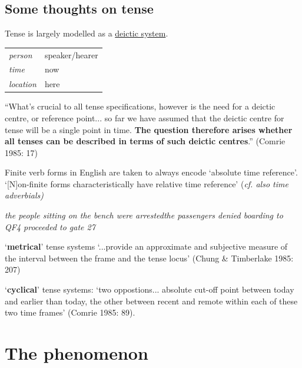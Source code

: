 \documentclass[11pt]{article}
\begin{document}
\begin{framed}
\vspace{-.4cm}\section*{Some thoughts on tense}
Tense is largely modelled as a \underline{deictic system}.\\\begin{tabular}{ll}
\textit{person} & {\sc speaker/hearer}\\
\textit{time} & {\sc now}\\
\textit{location} & {\sc here}
\end{tabular}


\vspace{.5cm}
``What's crucial to all tense specifications, however is the need for a deictic centre, or reference point... so far we have assumed that the deictic centre for tense will be a single point in time.  \textbf{The question therefore arises whether all tenses can be described in terms of such deictic centres}.'' (Comrie 1985: 17)

\vspace{.5cm}
Finite verb forms in English are taken to always encode `absolute time reference'. `[N]on-finite forms characteristically have relative time reference' (\textit{cf. also time adverbials)}
\begin{exe}\ex
\textit{the people sitting on the bench were arrested}\ex \textit{the passengers denied boarding to QF4 proceeded to gate 27}\end{exe}


\vspace{.5cm}
`\textbf{metrical}' tense systems `...provide an approximate and subjective measure of the interval between the frame and the tense locus' (Chung \& Timberlake 1985: 207)
 \vspace{0.5cm}
 
 `\textbf{cyclical}' tense systems: `two oppostions... absolute cut-off point between today and earlier than today, the other between recent and remote within each of these two time frames' (Comrie 1985: 89).\end{framed}
\section*{The phenomenon}
\end{document}
